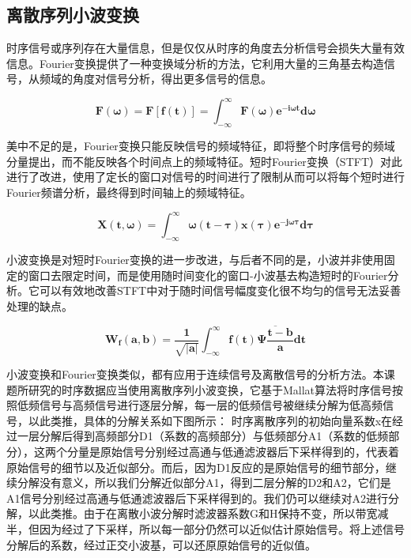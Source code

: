 \documentclass[a4paper,AutoFakeBold,oneside,12pt]{book}
\begin{document}
\subsection{离散序列小波变换}

	时序信号或序列存在大量信息，但是仅仅从时序的角度去分析信号会损失大量有效信息。Fourier变换提供了一种变换域分析的方法，它利用大量的三角基去构造信号，从频域的角度对信号分析，得出更多信号的信息。

	$$\bm{F(\omega)}=\bm{F[f(t)]}=\bm{\int_{-\infty}^{\infty} F(\omega)e^{-i\omega t} d\omega}$$

	美中不足的是，Fourier变换只能反映信号的频域特征，即将整个时序信号的频域分量提出，而不能反映各个时间点上的频域特征。短时Fourier变换（STFT）对此进行了改进，使用了定长的窗口对信号的时间进行了限制从而可以将每个短时进行Fourier频谱分析，最终得到时间轴上的频域特征。

	$$\bm{X(t,\omega)}=\bm{\int_{-\infty}^{\infty} \omega(t-\tau)x(\tau)e^{-j\omega\tau} d\tau}$$

	小波变换是对短时Fourier变换的进一步改进，与后者不同的是，小波并非使用固定的窗口去限定时间，而是使用随时间变化的窗口-小波基去构造短时的Fourier分析。它可以有效地改善STFT中对于随时间信号幅度变化很不均匀的信号无法妥善处理的缺点。

	$$\bm{W_f (a,b)}=\bm{\frac{1}{\sqrt{|a|}}\int_{-\infty}^{\infty}f(t)\overline{\Psi\frac{t-b}{a}}dt}$$

	小波变换和Fourier变换类似，都有应用于连续信号及离散信号的分析方法。本课题所研究的时序数据应当使用离散序列小波变换，它基于Mallat算法将时序信号按照低频信号与高频信号进行逐层分解，每一层的低频信号被继续分解为低高频信号，以此类推，具体的分解关系如下图所示：
	时序离散序列的初始向量系数x在经过一层分解后得到高频部分D1（系数的高频部分）与低频部分A1（系数的低频部分），这两个分量是原始信号分别经过高通与低通滤波器后下采样得到的，代表着原始信号的细节以及近似部分。而后，因为D1反应的是原始信号的细节部分，继续分解没有意义，所以我们分解近似部分A1，得到二层分解的D2和A2，它们是A1信号分别经过高通与低通滤波器后下采样得到的。我们仍可以继续对A2进行分解，以此类推。由于在离散小波分解时滤波器系数G和H保持不变，所以带宽减半，但因为经过了下采样，所以每一部分仍然可以近似估计原始信号。将上述信号分解后的系数，经过正交小波基，可以还原原始信号的近似值。
\end{document}
